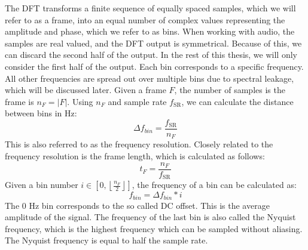 \documentclass[10pt,twocolumn]{article}
\newcommand{\floor}[1]{\left \lfloor #1 \right \rfloor}
\begin{document}
The DFT transforms a finite sequence of equally spaced samples, which we will refer to as a frame, into an equal number of complex values representing the amplitude and phase, which we refer to as bins. When working with audio, the samples are real valued, and the DFT output is symmetrical. Because of this, we can discard the second half of the output. In the rest of this thesis, we will only consider the first half of the output. Each bin corresponds to a specific frequency. All other frequencies are spread out over multiple bins due to spectral leakage, which will be discussed later. Given a frame $F$, the number of samples is the frame is $n_F = |F|$. Using $n_F$ and sample rate $f_{\text{SR}}$, we can calculate the distance between bins in Hz:
\[ \Delta f_{bin} = \frac{f_{\text{SR}}}{n_F} \]
This is also referred to as the frequency resolution. Closely related to the frequency resolution is the frame length, which is calculated as follows:
\[ t_F = \frac{n_F}{f_{\text{SR}}} \]
Given a bin number $i \in [0, \floor{\frac{n_F}{2}}]$, the frequency of a bin can be calculated as:
\[ f_{bin} = \Delta f_{bin} * i \]
The 0 Hz bin corresponds to the so called DC offset. This is the average amplitude of the signal. The frequency of the last bin is also called the Nyquist frequency, which is the highest frequency which can be sampled without aliasing. The Nyquist frequency is equal to half the sample rate.
\end{document}
